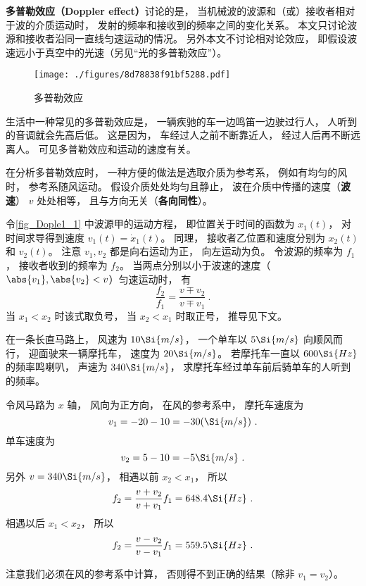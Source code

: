 

\textbf{多普勒效应（Doppler effect）}讨论的是， 当机械波的波源和（或）接收者相对于波的介质运动时， 发射的频率和接收到的频率之间的变化关系。 本文只讨论波源和接收者沿同一直线匀速运动的情况。 另外本文不讨论相对论效应， 即假设波速远小于真空中的光速（另见“光的多普勒效应”）。

\begin{figure}[ht]
\centering
\texttt{[image: ./figures/8d78838f91bf5288.pdf]}
\caption{多普勒效应} \label{fig_Dople1_1}
\end{figure}

\begin{example}{}
生活中一种常见的多普勒效应是， 一辆疾驰的车一边鸣笛一边驶过行人， 人听到的音调就会先高后低。 这是因为， 车经过人之前不断靠近人， 经过人后再不断远离人。 可见多普勒效应和运动的速度有关。
\end{example}

在分析多普勒效应时， 一种方便的做法是选取介质为参考系， 例如有均匀的风时， 参考系随风运动。 假设介质处处均匀且静止， 波在介质中传播的速度（\textbf{波速}） $v$ 处处相等， 且与方向无关（\textbf{各向同性}）。

令\autoref{fig_Dople1_1} 中波源甲的运动方程， 即位置关于时间的函数为 $x_1(t)$， 对时间求导得到速度 $v_1(t) = \dot{x}_1(t)$。 同理， 接收者乙位置和速度分别为 $x_2(t)$ 和 $v_2(t)$。 注意 $v_1, v_2$ 都是向右运动为正， 向左运动为负。 令波源的频率为 $f_1$， 接收者收到的频率为 $f_2$。 当两点分别以小于波速的速度（$\abs{v_1}, \abs{v_2} < v$）匀速运动时， 有
\begin{equation}\label{eq_Dople1_1}
\frac{f_2}{f_1} = \frac{v \mp v_2}{v \mp v_1}~.
\end{equation}
当 $x_1 < x_2$ 时该式取负号， 当 $x_2 < x_1$ 时取正号， 推导见下文。

\begin{exercise}{}
在一条长直马路上， 风速为 $10\Si{m/s}$， 一个单车以 $5\Si{m/s}$ 向顺风而行， 迎面驶来一辆摩托车， 速度为 $20\Si{m/s}$。 若摩托车一直以 $600\Si{Hz}$ 的频率鸣喇叭， 声速为 $340\Si{m/s}$， 求摩托车经过单车前后骑单车的人听到的频率。

令风马路为 $x$ 轴， 风向为正方向， 在风的参考系中， 摩托车速度为
\begin{equation}
v_1 = -20 - 10 = -30(\Si{m/s})~.
\end{equation}
单车速度为
\begin{equation}
v_2 = 5 - 10 = -5\Si{m/s}~.
\end{equation}
另外 $v = 340\Si{m/s}$， 相遇以前 $x_2 < x_1$， 所以
\begin{equation}
f_2 = \frac{v + v_2}{v + v_1} f_1 = 648.4\Si{Hz}~.
\end{equation}
相遇以后 $x_1 < x_2$， 所以
\begin{equation}
f_2 = \frac{v - v_2}{v - v_1} f_1 = 559.5\Si{Hz}~.
\end{equation}
\end{exercise}
注意我们必须在风的参考系中计算， 否则得不到正确的结果（除非 $v_1 = v_2$）。

